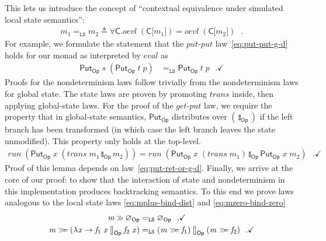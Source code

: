 \documentclass{jfp}
\newcommand{\Conid}[1]{\mathit{#1}}
\newcommand{\Varid}[1]{\mathit{#1}}
\let\Varid\mathit
\let\Conid\mathsf
\begin{document}
This lets us introduce the concept of ``contextual equivalence under simulated
local state semantics'':
\newcommand{\CEqLS}{=_\mathtt{LS}}
\begin{align*}
  \ensuremath{\Varid{m}_{1}} \CEqLS \ensuremath{\Varid{m}_{2}} \triangleq \forall \ensuremath{\Conid{C}}. \ensuremath{\Varid{oevl}\;(\Conid{C}\lbrack\Varid{m}_{1}\rbrack)} = \ensuremath{\Varid{oevl}\;(\Conid{C}\lbrack\Varid{m}_{2}\rbrack)} \mbox{~~.}
\end{align*}
For example, we formulate the statement that the \ensuremath{\Varid{put}}-\ensuremath{\Varid{put}}
law~\eqref{eq:put-put-g-d} holds for our monad as interpreted by \ensuremath{\Varid{eval}} as
\begin{align*}
  \ensuremath{\Conid{Put}_\Conid{Op}\;\Varid{s}\;(\Conid{Put}_\Conid{Op}\;\Varid{t}\;\Varid{p})} &\CEqLS \ensuremath{\Conid{Put}_\Conid{Op}\;\Varid{t}\;\Varid{p}} \mbox{~~.} \checkmark
\end{align*}
Proofs for the nondeterminism laws follow trivially from the nondeterminism laws
for global state.
The state laws are proven by promoting \ensuremath{\Varid{trans}} inside, then applying
global-state laws.
For the proof of the \ensuremath{\Varid{get}}-\ensuremath{\Varid{put}} law, we require the property that in
global-state semantics, \ensuremath{\Conid{Put}_\Conid{Op}} distributes over \ensuremath{(\talloblong_\Conid{Op})} if the left branch
has been transformed (in which case the left branch leaves the state unmodified).
This property only holds at the top-level.
\begin{align}
\ensuremath{\Varid{run}\;(\Conid{Put}_\Conid{Op}\;\Varid{x}\;(\Varid{trans}\;\Varid{m}_{1}\mathbin{\talloblong}_\Conid{Op}\Varid{m}_{2}))} = \ensuremath{\Varid{run}\;(\Conid{Put}_\Conid{Op}\;\Varid{x}\;(\Varid{trans}\;\Varid{m}_{1})\mathbin{\talloblong}_\Conid{Op}\Conid{Put}_\Conid{Op}\;\Varid{x}\;\Varid{m}_{2})} \label{eq:put-ret-mplus-g}\mbox{~~.} \checkmark
\end{align}
Proof of this lemma depends on law~\eqref{eq:put-ret-or-g-d}.
Finally, we arrive at the core of our proof:
to show that the interaction of state and nondeterminism in this
implementation produces backtracking semantics.
To this end we prove laws analogous to the local state laws
\eqref{eq:mplus-bind-dist} and \eqref{eq:mzero-bind-zero}
\begin{align}
  \ensuremath{\Varid{m}\mathbin{\hstretch{0.7}{>\!\!>}}\Varid{\varnothing}_\Conid{Op}}                      &\CEqLS \ensuremath{\Varid{\varnothing}_\Conid{Op}} \mbox{~~,} \label{eq:mplus-bind-zero-l} \checkmark \\
  \ensuremath{\Varid{m}\mathrel{\hstretch{0.7}{>\!\!>\!\!=}}(\lambda \Varid{x}\to \Varid{f}_{1}\;\Varid{x}\mathbin{\talloblong}_\Conid{Op}\Varid{f}_{2}\;\Varid{x})} &\CEqLS \ensuremath{(\Varid{m}\mathrel{\hstretch{0.7}{>\!\!>\!\!=}}\Varid{f}_{1})\mathbin{\talloblong}_\Conid{Op}(\Varid{m}\mathrel{\hstretch{0.7}{>\!\!>\!\!=}}\Varid{f}_{2})} \mbox{~~.} \checkmark \label{eq:mplus-bind-dist-l}
\end{align}
\end{document}
